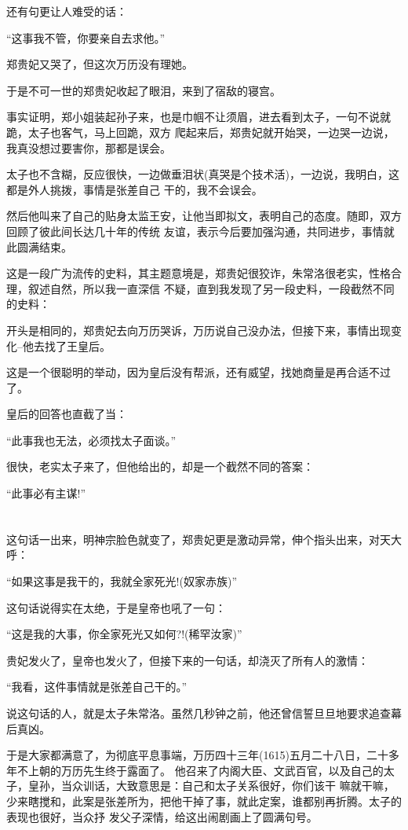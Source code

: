 \documentclass[11pt,a4paper,onecolumn]{article}
\begin{document}
还有句更让人难受的话：

``这事我不管，你要亲自去求他。''

郑贵妃又哭了，但这次万历没有理她。

于是不可一世的郑贵妃收起了眼泪，来到了宿敌的寝宫。

事实证明，郑小姐装起孙子来，也是巾帼不让须眉，进去看到太子，一句不说就跪，太子也客气，马上回跪，双方
爬起来后，郑贵妃就开始哭，一边哭一边说，我真没想过要害你，那都是误会。

太子也不含糊，反应很快，一边做垂泪状(真哭是个技术活)，一边说，我明白，这都是外人挑拨，事情是张差自己
干的，我不会误会。

然后他叫来了自己的贴身太监王安，让他当即拟文，表明自己的态度。随即，双方回顾了彼此间长达几十年的传统
友谊，表示今后要加强沟通，共同进步，事情就此圆满结束。

这是一段广为流传的史料，其主题意境是，郑贵妃很狡诈，朱常洛很老实，性格合理，叙述自然，所以我一直深信
不疑，直到我发现了另一段史料，一段截然不同的史料：

开头是相同的，郑贵妃去向万历哭诉，万历说自己没办法，但接下来，事情出现变化--他去找了王皇后。

这是一个很聪明的举动，因为皇后没有帮派，还有威望，找她商量是再合适不过了。

皇后的回答也直截了当：

``此事我也无法，必须找太子面谈。''

很快，老实太子来了，但他给出的，却是一个截然不同的答案：

``此事必有主谋!''

\section[\thesection]{}

这句话一出来，明神宗脸色就变了，郑贵妃更是激动异常，伸个指头出来，对天大呼：

``如果这事是我干的，我就全家死光!(奴家赤族)''

这句话说得实在太绝，于是皇帝也吼了一句：

``这是我的大事，你全家死光又如何?!(稀罕汝家)''

贵妃发火了，皇帝也发火了，但接下来的一句话，却浇灭了所有人的激情：

``我看，这件事情就是张差自己干的。''

说这句话的人，就是太子朱常洛。虽然几秒钟之前，他还曾信誓旦旦地要求追查幕后真凶。

于是大家都满意了，为彻底平息事端，万历四十三年(1615)五月二十八日，二十多年不上朝的万历先生终于露面了。
他召来了内阁大臣、文武百官，以及自己的太子，皇孙，当众训话，大致意思是：自己和太子关系很好，你们该干
嘛就干嘛，少来瞎搅和，此案是张差所为，把他干掉了事，就此定案，谁都别再折腾。太子的表现也很好，当众抒
发父子深情，给这出闹剧画上了圆满句号。
\end{document}
